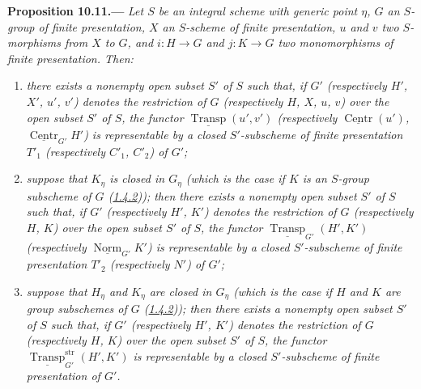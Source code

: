 \medskip
{}\label{prop:sga3-VIB-10.11}%
\noindent\textbf{Proposition 10.11.---}
\emph{Let \(S\) be an integral scheme with generic point
\(\eta\), \(G\) an \(S\)-group of finite presentation, \(X\) an
\(S\)-scheme of finite presentation, \(u\) and \(v\) two
\(S\)-morphisms from \(X\) to \(G\), and \(i:H\to G\) and
\(j:K\to G\) two monomorphisms of finite presentation. Then:}
\begin{enumerate}
\item[\textup{(i)}] \emph{there exists a nonempty open subset \(S'\) of \(S\) such that, if \(G'\)
  \textup{(}respectively \(H'\), \(X'\), \(u'\), \(v'\)\textup{)} denotes the restriction of \(G\)
  \textup{(}respectively \(H\), \(X\), \(u\), \(v\)\textup{)} over the open subset \(S'\) of \(S\), the
  functor \(\underline{\operatorname{Transp}}(u',v')\) \textup{(}respectively
  \(\underline{\operatorname{Centr}}(u')\), \(\underline{\operatorname{Centr}}_{G'}H'\)\textup{)} is
  representable by a closed \(S'\)-subscheme of finite presentation \(T'_1\) \textup{(}respectively
  \(C'_1\), \(C'_2\)\textup{)} of \(G'\);}
\item[\textup{(ii)}] \emph{suppose that \(K_\eta\) is closed in \(G_\eta\) \textup{(}which is the case if
  \(K\) is an \(S\)-group subscheme of \(G\) \textup{(\hyperref[cor:sga3-VIB-1.4.2]{1.4.2}))}; then there
  exists a nonempty open subset \(S'\) of \(S\) such that, if \(G'\) \textup{(}respectively \(H'\),
  \(K'\)\textup{)} denotes the restriction of \(G\) \textup{(}respectively \(H\), \(K\)\textup{)} over the
  open subset \(S'\) of \(S\), the functor \(\underline{\operatorname{Transp}}_{G'}(H',K')\)
  \textup{(}respectively \(\underline{\operatorname{Norm}}_{G'}K'\)\textup{)} is representable by a closed
  \(S'\)-subscheme of finite presentation \(T'_2\) \textup{(}respectively \(N'\)\textup{)} of \(G'\);}
\item[\textup{(iii)}] \emph{suppose that \(H_\eta\) and \(K_\eta\) are closed in \(G_\eta\) \textup{(}which
  is the case if \(H\) and \(K\) are group subschemes of \(G\)
  \textup{(\hyperref[cor:sga3-VIB-1.4.2]{1.4.2}))}; then there exists a nonempty open subset \(S'\) of
  \(S\) such that, if \(G'\) \textup{(}respectively \(H'\), \(K'\)\textup{)} denotes the restriction of
  \(G\) \textup{(}respectively \(H\), \(K\)\textup{)} over the open subset \(S'\) of \(S\), the functor
  \(\underline{\operatorname{Transp}}^{\mathrm{str}}_{G'}(H',K')\) is representable by a closed
  \(S'\)-subscheme of finite presentation of \(G'\).}
\end{enumerate}

